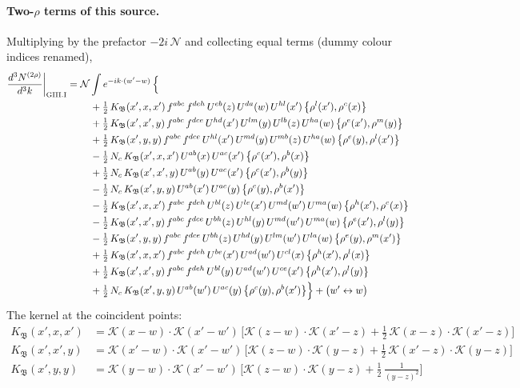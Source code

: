 \documentclass[10pt]{article}
\numberwithin{equation}{section}
\newcommand{\KK}{\mathcal K}
\newcommand{\NN}{\mathcal N}
\begin{document}
\paragraph{Two-$\rho$ terms of this source.} Multiplying by the prefactor $-2i\,\NN$ and collecting equal terms (dummy colour indices renamed),
\begin{align}
\frac{d^3N^{(2\rho)}}{d^3k}\bigg|_{\rm GIII.I}={}&\NN\int e^{-ik\cdot(w'-w)}\,\Big\{\notag\\
&\quad +\tfrac12\,K_{\mathfrak B}(x',x,x')\,f^{abc}\,f^{deh}\,U^{eb}(z)\,U^{da}(w)\,U^{hl}(x')\,\big\{\rho^{l}(x'),\rho^{c}(x)\big\}\notag\\
&\quad +\tfrac12\,K_{\mathfrak B}(x',x',y)\,f^{abc}\,f^{dce}\,U^{hd}(x')\,U^{lm}(y)\,U^{lb}(z)\,U^{ha}(w)\,\big\{\rho^{e}(x'),\rho^{m}(y)\big\}\notag\\
&\quad +\tfrac12\,K_{\mathfrak B}(x',y,y)\,f^{abc}\,f^{dce}\,U^{hl}(x')\,U^{md}(y)\,U^{mb}(z)\,U^{ha}(w)\,\big\{\rho^{e}(y),\rho^{l}(x')\big\}\notag\\
&\quad -\tfrac12\,N_{c}\,K_{\mathfrak B}(x',x,x')\,U^{ab}(x)\,U^{ac}(x')\,\big\{\rho^{c}(x'),\rho^{b}(x)\big\}\notag\\
&\quad +\tfrac12\,N_{c}\,K_{\mathfrak B}(x',x',y)\,U^{ab}(y)\,U^{ac}(x')\,\big\{\rho^{c}(x'),\rho^{b}(y)\big\}\notag\\
&\quad -\tfrac12\,N_{c}\,K_{\mathfrak B}(x',y,y)\,U^{ab}(x')\,U^{ac}(y)\,\big\{\rho^{c}(y),\rho^{b}(x')\big\}\notag\\
&\quad -\tfrac12\,K_{\mathfrak B}(x',x,x')\,f^{abc}\,f^{deh}\,U^{bl}(z)\,U^{le}(x')\,U^{md}(w')\,U^{ma}(w)\,\big\{\rho^{h}(x'),\rho^{c}(x)\big\}\notag\\
&\quad -\tfrac12\,K_{\mathfrak B}(x',x',y)\,f^{abc}\,f^{dce}\,U^{bh}(z)\,U^{hl}(y)\,U^{md}(w')\,U^{ma}(w)\,\big\{\rho^{e}(x'),\rho^{l}(y)\big\}\notag\\
&\quad -\tfrac12\,K_{\mathfrak B}(x',y,y)\,f^{abc}\,f^{dce}\,U^{bh}(z)\,U^{hd}(y)\,U^{lm}(w')\,U^{la}(w)\,\big\{\rho^{e}(y),\rho^{m}(x')\big\}\notag\\
&\quad +\tfrac12\,K_{\mathfrak B}(x',x,x')\,f^{abc}\,f^{deh}\,U^{be}(x')\,U^{ad}(w')\,U^{cl}(x)\,\big\{\rho^{h}(x'),\rho^{l}(x)\big\}\notag\\
&\quad +\tfrac12\,K_{\mathfrak B}(x',x',y)\,f^{abc}\,f^{deh}\,U^{bl}(y)\,U^{ad}(w')\,U^{ce}(x')\,\big\{\rho^{h}(x'),\rho^{l}(y)\big\}\notag\\
&\quad +\tfrac12\,N_{c}\,K_{\mathfrak B}(x',y,y)\,U^{ab}(w')\,U^{ac}(y)\,\big\{\rho^{c}(y),\rho^{b}(x')\big\}\Big\}+\big(w'\leftrightarrow w\big)\label{R:eq:res-GIII.I}
\end{align}
The kernel at the coincident points:
\begin{align*}
K_{\mathfrak B}(x',x,x')&=\KK(x-w)\cdot\KK(x'-w')\,\Big[\KK(z-w)\cdot\KK(x'-z)+\tfrac12\,\KK(x-z)\cdot\KK(x'-z)\Big]\\K_{\mathfrak B}(x',x',y)&=\KK(x'-w)\cdot\KK(x'-w')\,\Big[\KK(z-w)\cdot\KK(y-z)+\tfrac12\,\KK(x'-z)\cdot\KK(y-z)\Big]\\K_{\mathfrak B}(x',y,y)&=\KK(y-w)\cdot\KK(x'-w')\,\Big[\KK(z-w)\cdot\KK(y-z)+\tfrac12\,\frac{1}{(y-z)^2}\Big]
\end{align*}
\end{document}
